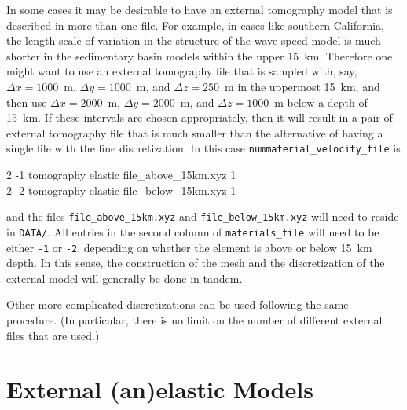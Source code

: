 In some cases it may be desirable to have an external tomography model that is described in more than one file. For example, in cases like southern California, the length scale of variation in the structure of the wave speed model is much shorter in the sedimentary basin models within the upper 15~km. Therefore one might want to use an external tomography file that is sampled with, say, $\Delta x = 1000$~m, $\Delta y = 1000$~m, and $\Delta z = 250$~m in the uppermost 15~km, and then use $\Delta x = 2000$~m, $\Delta y = 2000$~m, and $\Delta z = 1000$~m below a depth of 15~km. If these intervals are chosen appropriately, then it will result in a pair of external tomography file that is much smaller than the alternative of having a single file with the fine discretization. In this case  \texttt{nummaterial\_velocity\_file} is
%
\begin{lyxcode}
2  -1 tomography elastic file\_above\_15km.xyz 1 \\
2  -2 tomography elastic file\_below\_15km.xyz 1
\end{lyxcode}
%
and the files \texttt{file\_above\_15km.xyz} and \texttt{file\_below\_15km.xyz} will need to reside in \texttt{DATA/}.  All entries in the second column of \texttt{materials\_file} will need to be either \texttt{-1} or \texttt{-2}, depending on whether the element is above or below 15~km depth. In this sense, the construction of the mesh and the discretization of the external model will generally be done in tandem.

Other more complicated discretizations can be used following the same procedure. (In particular, there is no limit on the number of different external files that are used.)



\section{External (an)elastic Models}\label{sec:Anelastic-Models}

